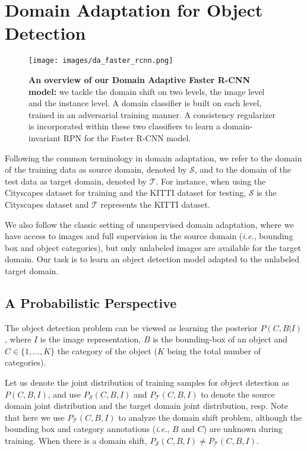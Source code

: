 \documentclass[10pt,twocolumn,letterpaper]{article}
\def\ie{\emph{i.e.}}
\def\cS{\mathcal{S}}
\def\cT{\mathcal{T}}
\begin{document}
\section{Domain Adaptation for Object Detection}
\label{sec:dadet}
\begin{figure*}
\centering
\texttt{[image: images/da\_faster\_rcnn.png]}
\caption{\textbf{An overview of our Domain Adaptive Faster R-CNN model:} we tackle the domain shift on two levels, the image level and the instance level. A domain classifier is built on each level, trained in an adversarial training manner. A consistency regularizer is incorporated within these two classifiers to learn a domain-invariant RPN for the Faster R-CNN model.}
\label{fig:da_faster_rcnn}
\vspace{-2mm}
\end{figure*}

Following the common terminology in domain adaptation, we refer to the domain of the training data as source domain, denoted by $\cS$, and to the domain of the test data as target domain, denoted by $\cT$. For instance, when using the Cityscapes dataset for training and the KITTI dataset for testing, $\cS$ is the Cityscapes dataset and $\cT$ represents the KITTI dataset. 

We also follow the classic setting of unsupervised domain adaptation, where we have access to images and full supervision in the source domain (\ie, bounding box and object categories), but only unlabeled images are available for the target domain. Our task is to learn an object detection model adapted to the unlabeled target domain.

\subsection{A Probabilistic Perspective}
\label{sec:dadet_prob}
The object detection problem can be viewed as learning the posterior $P(C,B|I)$, where $I$ is the image representation,  $B$ is the bounding-box of an object and $C \in \{1, \ldots, K\}$ the category of the object ($K$ being the total number of categories). 

Let us denote the joint distribution of training samples for object detection as $P(C, B, I)$, and use $P_{\cS}(C, B, I)$ and $P_{\cT}(C, B, I)$ to denote the source domain joint distribution and the target domain joint distribution, resp. Note that here we use $P_{\cT}(C, B, I)$ to analyze the domain shift problem, although the bounding box and category annotations (\ie, $B$ and $C$) are unknown during training. When there is a domain shift, $P_{\cS}(C, B, I) \neq P_{\cT}(C, B, I)$.
\end{document}
